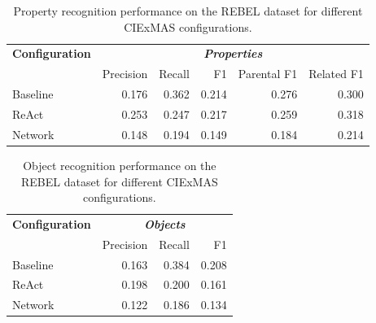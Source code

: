 \documentclass[a4paper,oneside,bibliography=totoc]{scrbook}
\begin{document}
\begin{table}[h]
  \centering
  \begin{tabular}{l|rrrrr}
    \toprule
    \textbf{Configuration} & \multicolumn{5}{c}{\textit{\textbf{Properties}}}                                             \\
                           & Precision                                        & Recall & F1    & Parental F1 & Related F1 \\
    \midrule
    Baseline               & 0.176                                            & 0.362  & 0.214 & 0.276       & 0.300      \\
    ReAct                  & 0.253                                            & 0.247  & 0.217 & 0.259       & 0.318      \\
    Network                & 0.148                                            & 0.194  & 0.149 & 0.184       & 0.214      \\
    \bottomrule
  \end{tabular}
  \caption{Property recognition performance on the REBEL dataset for different CIExMAS configurations.}
  \label{tab:rebel_properties}
\end{table}

\begin{table}[h]
  \centering
  \begin{tabular}{l|rrr}
    \toprule
    \textbf{Configuration} & \multicolumn{3}{c}{\textit{\textbf{Objects}}}                  \\
                           & Precision                                     & Recall & F1    \\
    \midrule
    Baseline               & 0.163                                         & 0.384  & 0.208 \\
    ReAct                  & 0.198                                         & 0.200  & 0.161 \\
    Network                & 0.122                                         & 0.186  & 0.134 \\
    \bottomrule
  \end{tabular}
  \caption{Object recognition performance on the REBEL dataset for different CIExMAS configurations.}
  \label{tab:rebel_objects}
\end{table}
\end{document}
